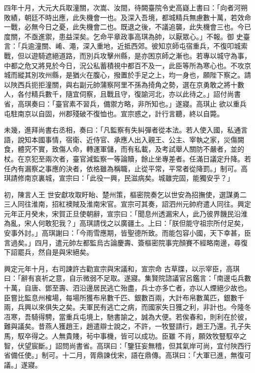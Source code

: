\begin{pinyinscope}
 四年十月，大元大兵取潼關，次嵩、汝間，待闕臺院令史高嶷上書曰：「向者河朔敗績，朝廷不時出應，此失機會一也。及深入吾境，都城精兵無慮數十萬，若效命一戰，必無今日之憂，此失機會二也。既退之後，不議追襲，此失機會三也。今已度關，不亟進禦，患益深矣。乞命平章政事高琪為帥，以厭眾心。」不報。御
 史臺言：「兵逾潼關、崤、澠，深入重地，近抵西郊。彼知京師屯宿重兵，不復叩城索戰，但以遊騎遮絕道路，而別兵攻擊州縣，是亦困京師之漸也。若專以城守為事，中都之危又將見於今日，況公私蓄積視中都百不及一，此臣等所為寒心也。不攻京城而縱其別攻州縣，是猶火在腹心，撥置於手足之上，均一身也，願陛下察之。請以陜西兵扼拒潼關，與右副元帥蒲察阿里不孫為掎角之勢，選在京勇敢之將十數人，各付精兵數千，隨宜伺察，且戰且守，復諭河北，亦以此待之。」詔付尚書省，高琪奏曰：「臺官素不習兵，備禦方略，非所知也。」遂寢。高琪止
 欲以重兵屯駐南京以自固，州郡殘破不復恤也。宣宗惑之，計行言聽，終以自斃。



 未幾，進拜尚書右丞相，奏曰：「凡監察有失糾彈者從本法。若人使入國，私通言語，說知本國事情，宿衛、近侍官、承應人出入親王、公主、宰執之家，災傷闕食，體究不實，致傷人命，轉運軍儲，而有私載，及考試舉人關防不嚴者，並的杖。在京犯至兩次者，臺官減監察一等論贖，餘止坐專差者。任滿日議定升降。若任內有漏察之事應的決者，依格雖為稱職，止從平常，平常者從降罰。」制可。高琪請修南京裏城，宣宗曰：「此役一興，民滋病矣。城雖完固，能獨安乎？」



 初，陳言人王
 世安獻攻取盱眙、楚州策，樞密院奏乞以世安為招撫使，選謀勇二三人同往淮南，招紅襖賊及淮南宋官。宣宗可其奏，詔泗州元帥府遣人同往。興定元年正月癸未，宋賀正旦使朝辭，宣宗曰：「聞息州透漏宋人，此乃彼界饑民沿淮為亂，宋人何敢犯我？」高琪請伐之以廣疆土。上曰：「朕但能守祖宗所付足矣，安事外討。」高琪謝曰：「今雨雪應期，皆聖德所致。而能包容小國，天下幸甚，臣言過矣。」四月，遣元帥左都監烏古論慶壽、簽樞密院事完顏賽不經略南邊，尋復下詔罷兵，然自是與宋絕矣。



 興定元年十月，右司諫許古勸宣宗與宋議和，宣宗命
 古草牒，以示宰臣，高琪曰：「辭有哀祈之意，自示微弱不足取。遂寢。集賢院諮議官呂鑑言：「南邊屯兵數十萬，自唐、鄧至壽、泗沿邊居民逃亡殆盡，兵士亦多亡者，亦以人煙絕少故也。臣嘗比監息州榷場，每場所獲布帛數千匹、銀數百兩，大計布帛數萬匹，銀數千兩，兵興以來俱失之矣。夫軍民有逃亡之病，而國家失日獲之利，非計也。今隆冬冱寒，吾騎得騁，當重兵屯境上，馳書諭之，誠為大便。若俟春和，則利在於彼，難與議矣。昔燕人獲趙王，趙遣辯士說之，不許，一牧豎請行，趙王乃還。孔子失馬，馭卒得之。人無貴賤，茍中事機，皆可以成功。臣雖
 不肖，願效牧豎馭卒之智，伏望宸斷。」詔問尚書省。高琪曰：「鑒狂妄無稽，但其氣岸可尚，宜付陜西行省備任使。」制可。十二月，胥鼎諫伐宋，語在鼎傳。高琪曰：「大軍已進，無復可議。」遂寢。




\end{pinyinscope}
